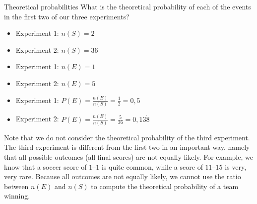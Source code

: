 \begin{wex}{Theoretical probabilities}{
  What is the theoretical probability of each of the events in the
  first two of our three experiments?
}{

  \begin{itemize}
  \item[] Experiment 1: $n(S) = 2$
  \item[] Experiment 2: $n(S) = 36$
  \end{itemize}
  

  \begin{itemize}
  \item[] Experiment 1: $n(E) = 1$
  \item[] Experiment 2: $n(E) = 5$
  \end{itemize}


  \begin{itemize}
  \item[] Experiment 1: $P(E) = \frac{n(E)}{n(S)} = \frac{1}{2} = 0,5$
  \item[] Experiment 2: $P(E) = \frac{n(E)}{n(S)} = \frac{5}{36} = 0,13\dot{8}$
  \end{itemize}
}
\end{wex}

Note that we do not consider the theoretical probability of the third
experiment. The third experiment is different from the first two in an
important way, namely that all possible outcomes (all final scores)
are not equally likely. For example, we know that a soccer score of
$1$--$1$ is quite common, while a score of $11$--$15$ is very, very
rare. Because all outcomes are not equally likely, we cannot use the
ratio between \(n(E)\) and \(n(S)\) to compute the theoretical
probability of a team winning. 

